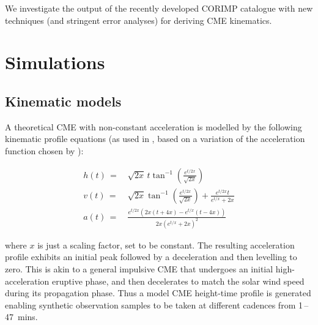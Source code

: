 \documentclass[structabstract]{aa}
\begin{document}
We investigate the output of the recently developed CORIMP catalogue with new techniques (and stringent error analyses) for deriving CME kinematics. %



\section{Simulations}

\subsection{Kinematic models}

A theoretical CME with non-constant acceleration is modelled by the following kinematic profile equations (as used in \citealt{2012ApJ...752..145B}, based on a variation of the acceleration function chosen by \citealt{2003ApJ...588L..53G}):

\begin{eqnarray}
h(t)\,=&\,\sqrt{2x}\,t\tan^{-1}\left(\frac{e^{t/2x}}{\sqrt{2x}}\right) \\
v(t)\,=&\,\sqrt{2x}\tan^{-1}\left(\frac{e^{t/2x}}{\sqrt{2x}}\right)+\frac{e^{t/2x}t}{e^{t/x}+2x} \\
a(t)\,=&\,\frac{e^{t/2x}\left(2x\left(t+4x\right)-e^{t/x}\left(t-4x\right)\right)}{2x\left(e^{t/x}+2x\right)^2}
\end{eqnarray}

where $x$ is just a scaling factor, set to be constant. The resulting acceleration profile exhibits an initial peak followed by a deceleration and then levelling to zero. This is akin to a general impulsive CME that undergoes an initial high-acceleration eruptive phase, and then decelerates to match the solar wind speed during its propagation phase. Thus a model CME height-time profile is generated enabling synthetic observation samples to be taken at different cadences from 1\,--\,47~mins. 
\end{document}
